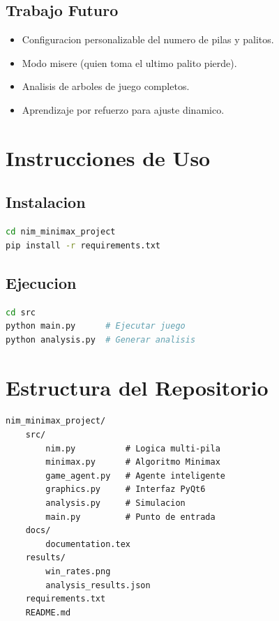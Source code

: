 \documentclass[12pt,a4paper]{article}
\theoremstyle{definition}
\begin{document}
\subsection{Trabajo Futuro}

\begin{itemize}
    \item Configuracion personalizable del numero de pilas y palitos.
    \item Modo misere (quien toma el ultimo palito pierde).
    \item Analisis de arboles de juego completos.
    \item Aprendizaje por refuerzo para ajuste dinamico.
\end{itemize}

\appendix

\section{Instrucciones de Uso}

\subsection{Instalacion}

\begin{lstlisting}[language=bash]
cd nim_minimax_project
pip install -r requirements.txt
\end{lstlisting}

\subsection{Ejecucion}

\begin{lstlisting}[language=bash]
cd src
python main.py      # Ejecutar juego
python analysis.py  # Generar analisis
\end{lstlisting}

\section{Estructura del Repositorio}

\begin{verbatim}
nim_minimax_project/
    src/
        nim.py          # Logica multi-pila
        minimax.py      # Algoritmo Minimax
        game_agent.py   # Agente inteligente
        graphics.py     # Interfaz PyQt6
        analysis.py     # Simulacion
        main.py         # Punto de entrada
    docs/
        documentation.tex
    results/
        win_rates.png
        analysis_results.json
    requirements.txt
    README.md
\end{verbatim}
\end{document}
